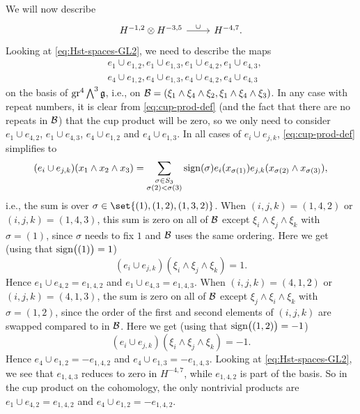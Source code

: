 We will now describe
\[
  \begin{tikzcd}
    H^{-1,2} \otimes H^{-3,5} \ar[r,"\cup"] & H^{-4,7}.
  \end{tikzcd}
\]
Looking at \eqref{eq:Hst-spaces-GL2}, we need to describe the maps
\begin{align*}
  &e_{1} \cup e_{1,2}, e_{1} \cup e_{1,3}, e_{1} \cup e_{4,2}, e_{1} \cup e_{4,3}, \\
  &e_{4} \cup e_{1,2}, e_{4} \cup e_{1,3}, e_{4} \cup e_{4,2}, e_{4} \cup e_{4,3}
\end{align*}
on the basis of $\operatorname{gr}^{4} \bigwedge^{3}\mathfrak{g}$, i.e., on $\mathcal{B} = (\xi_{1} \wedge \xi_{4} \wedge \xi_{2}, \xi_{1} \wedge \xi_{4} \wedge \xi_{3})$. In any case with repeat numbers, it is clear from \eqref{eq:cup-prod-def} (and the fact that there are no repeats in $\mathcal{B}$) that the cup product will be zero, so we only need to consider $e_{1} \cup e_{4,2}$, $e_{1} \cup e_{4,3}$, $e_{4} \cup e_{1,2}$ and $e_{4} \cup e_{1,3}$. In all cases of $e_{i} \cup e_{j,k}$, \eqref{eq:cup-prod-def} simplifies to
\begin{equation*}
  (e_{i} \cup e_{j,k})(x_{1} \wedge x_{2} \wedge x_{3}) = \sum_{\substack{\sigma \in S_{3} \\ \sigma(2) < \sigma(3)}} \operatorname{sign}(\sigma) e_{i}(x_{\sigma(1)}) e_{j,k}(x_{\sigma(2)} \wedge x_{\sigma(3)}),
\end{equation*}
i.e., the sum is over $\sigma \in \set{(1), (1,2), (1,3,2)}$. When $(i,j,k) = (1,4,2)$ or $(i,j,k) = (1,4,3)$, this sum is zero on all of $\mathcal{B}$ except $\xi_{i} \wedge \xi_{j} \wedge \xi_{k}$ with $\sigma=(1)$, since $\sigma$ needs to fix $1$ and $\mathcal{B}$ uses the same ordering. Here we get (using that $\operatorname{sign}\bigl((1)\bigr) = 1$)
\begin{equation*}
  (e_{i} \cup e_{j,k})(\xi_{i} \wedge \xi_{j} \wedge \xi_{k}) = 1.
\end{equation*}
Hence $e_{1} \cup e_{4,2} = e_{1,4,2}$ and $e_{1} \cup e_{4,3} = e_{1,4,3}$. When $(i,j,k) = (4,1,2)$ or $(i,j,k) = (4,1,3)$, the sum is zero on all of $\mathcal{B}$ except $\xi_{j} \wedge \xi_{i} \wedge \xi_{k}$ with $\sigma=(1,2)$, since the order of the first and second elements of $(i,j,k)$ are swapped compared to in $\mathcal{B}$. Here we get (using that $\operatorname{sign}\bigl((1,2)\bigr) = -1$)
\begin{equation*}
  (e_{i} \cup e_{j,k})(\xi_{i} \wedge \xi_{j} \wedge \xi_{k}) = -1.
\end{equation*}
Hence $e_{4} \cup e_{1,2} = -e_{1,4,2}$ and $e_{4} \cup e_{1,3} = -e_{1,4,3}$. Looking at \eqref{eq:Hst-spaces-GL2}, we see that $e_{1,4,3}$ reduces to zero in $H^{-4,7}$, while $e_{1,4,2}$ is part of the basis. So in the cup product on the cohomology, the only nontrivial products are $e_{1} \cup e_{4,2} = e_{1,4,2}$ and $e_{4} \cup e_{1,2} = -e_{1,4,2}$.

